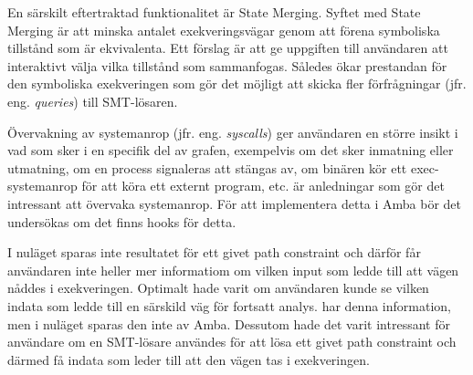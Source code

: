 En särskilt eftertraktad funktionalitet är State Merging. Syftet
med State Merging är att minska antalet exekveringsvägar genom att förena
symboliska tillstånd som är ekvivalenta. Ett förslag är att ge uppgiften till
användaren att interaktivt välja vilka tillstånd som sammanfogas. Således ökar
prestandan för den symboliska exekveringen som gör det möjligt att skicka fler
förfrågningar (jfr. eng. \emph{queries}) till SMT-lösaren.

Övervakning av systemanrop (jfr. eng. \emph{syscalls}) ger användaren en större
insikt i vad som sker i en specifik del av grafen, exempelvis om det sker
inmatning eller utmatning, om en process signaleras att stängas av, om binären
kör ett exec-systemanrop för att köra ett externt program, etc. är anledningar
som gör det intressant att övervaka systemanrop. För att implementera detta i
Amba bör det undersökas om det finns hooks för detta.

I nuläget sparas inte resultatet för ett givet path constraint
och därför får användaren inte heller mer informatiom om vilken input som ledde
till att vägen nåddes i exekveringen. Optimalt hade varit om användaren kunde se
vilken indata som ledde till en särskild väg för fortsatt analys. \stoe{} har
denna information, men i nuläget sparas den inte av Amba. Dessutom hade det
varit intressant för användare om en SMT-lösare användes för att lösa ett givet
path constraint och därmed få indata som leder till att den vägen tas i
exekveringen.

